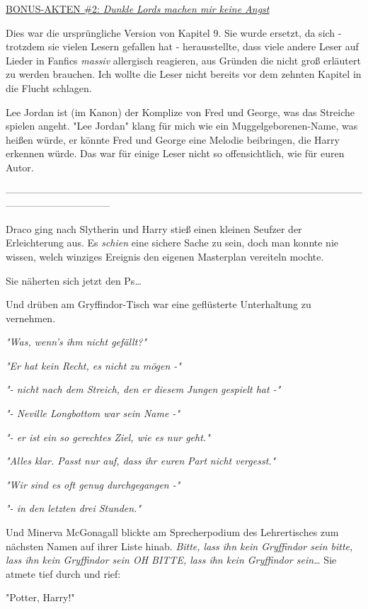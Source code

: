 {\uline{BONUS-AKTEN \#2: \emph{Dunkle Lords machen mir keine Angst}}

Dies war die ursprüngliche Version von Kapitel 9. Sie wurde ersetzt, da sich - trotzdem sie vielen Lesern gefallen hat - herausstellte, dass viele andere Leser auf Lieder in Fanfics \emph{massiv} allergisch reagieren, aus Gründen die nicht groß erläutert zu werden brauchen. Ich wollte die Leser nicht bereits vor dem zehnten Kapitel in die Flucht schlagen.

Lee Jordan ist (im Kanon) der Komplize von Fred und George, was das Streiche spielen angeht. "Lee Jordan" klang für mich wie ein Muggelgeborenen-Name, was heißen würde, er könnte Fred und George eine Melodie beibringen, die Harry erkennen würde. Das war für einige Leser nicht so offensichtlich, wie für euren Autor.

--------------------------------------------------------------------------------------------------------------------------------------------

Draco ging nach Slytherin und Harry stieß einen kleinen Seufzer der Erleichterung aus. Es \emph{schien} eine sichere Sache zu sein, doch man konnte nie wissen, welch winziges Ereignis den eigenen Masterplan vereiteln mochte.

Sie näherten sich jetzt den Ps…

Und drüben am Gryffindor-Tisch war eine geflüsterte Unterhaltung zu vernehmen.

\emph{"Was, wenn's ihm nicht gefällt?"}

\emph{"Er hat kein Recht, es nicht zu mögen -"}

\emph{"- nicht nach dem Streich, den er} \emph{diesem} \emph{Jungen} \emph{gespielt hat -"}

\emph{"- Neville Longbottom war sein Name -"}

\emph{"- er ist ein so gerechtes Ziel, wie es nur geht."}

\emph{"Alles klar. Passt nur auf, dass ihr euren} \emph{Part} \emph{nicht vergesst."}

\emph{"Wir sind es oft genug durchgegangen -"}

\emph{"- in den letzten drei Stunden."}

Und Minerva McGonagall blickte am Sprecherpodium des Lehrertisches zum nächsten Namen auf ihrer Liste hinab. \emph{Bitte, lass ihn kein Gryffindor sein bitte, lass ihn kein Gryffindor sein OH BITTE, lass ihn kein Gryffindor sein…} Sie atmete tief durch und rief:

"Potter, Harry!"

}
